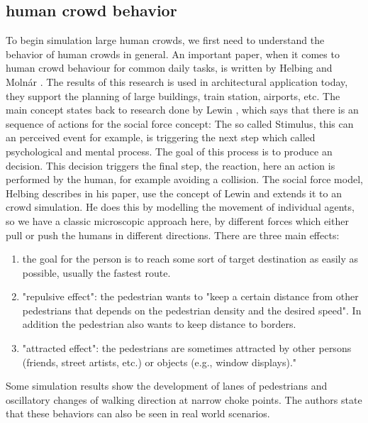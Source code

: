 \documentclass{acmsiggraph}               %
\begin{document}
\subsection{human crowd behavior}
\label{chap:helbing} To begin simulation large human crowds, we first need to understand the behavior of human crowds in general. An important paper, when it comes to human crowd behaviour for common daily tasks, is written by Helbing and Molnár . 
 The results of this research is used in architectural application today, they support the planning of large buildings, train station, airports, etc.
The main concept states back to research done by Lewin , which says that there is an sequence of actions for the social force concept: The so called Stimulus, this can an perceived event for example, is triggering the next step which called psychological and mental process. The goal of this process is to produce an decision. This decision triggers the final step, the reaction, here an action is performed by the human, for example avoiding a collision.
The social force model, Helbing describes in his paper, use the concept of Lewin and extends it to an crowd simulation. He does this by modelling the movement of individual agents, so we have a classic microscopic approach here, by different forces which either pull or push the humans in different directions. There are three main effects: 
\begin{enumerate}
    \item the goal for the person is to reach some sort of target destination as easily as possible, usually the fastest route.
    \item "repulsive effect": the pedestrian wants to "keep a certain distance from other pedestrians that depends on the pedestrian density and the desired speed". In addition the pedestrian also wants to keep distance to borders.  
    \item "attracted effect": the pedestrians are sometimes attracted by other persons (friends, street artists, etc.) or objects (e.g., window displays)."
\end{enumerate}
Some simulation results show the development of lanes of pedestrians and oscillatory changes of walking direction at narrow choke points. The authors state that these behaviors can also be seen in real world scenarios. 
\end{document}
